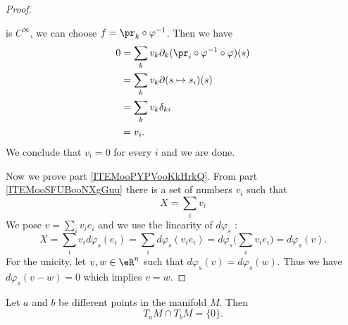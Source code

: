 \begin{proof}
\begin{subproof}
\begin{equation}
		\end{equation}
		is \(  C^{\infty}\), we can choose \( f=\pr_k\circ\varphi^{-1}\). Then we have
		\begin{subequations}
			\begin{align}
				0 & =\sum_kv_k\partial_k(\pr_i\circ\varphi^{-1}\circ\varphi)(s) \\
				  & =\sum_kv_k\partial(s\mapsto s_i)(s)                         \\
				  & =\sum_kv_k\delta_{ki}                                       \\
				  & =v_i.
			\end{align}
		\end{subequations}
		We conclude that \( v_i=0\) for every \( i\) and we are done.
	\end{subproof}
	Now we prove part \ref{ITEMooPYPVooKkHrkQ}. From part \ref{ITEMooSFUBooNXgGuu} there is a set of numbers \( v_i\) such that
	\begin{equation}
		X=\sum_iv_i
	\end{equation}
	We pose \( v=\sum_iv_ie_i\) and we use the linearity of \( d\varphi_s\) :
	\begin{equation}
		X=\sum_iv_id\varphi_s(e_i)=\sum_id\varphi_s(v_ie_i)=d\varphi_s\big( \sum_iv_ie_i \big)=d\varphi_s(v).
	\end{equation}
	For the unicity, let \( v,w\in \eR^n\) such that \( d\varphi_s(v)=d\varphi_s(w)\). Thus we have \( d\varphi_s(v-w)=0\) which implies \( v=w\).
\end{proof}

\begin{lemma}
	Let \( a\) and \( b\) be different points in the manifold \( M\). Then
	\begin{equation}
		T_aM\cap T_bM=\{ 0 \}.
	\end{equation}
\end{lemma}

